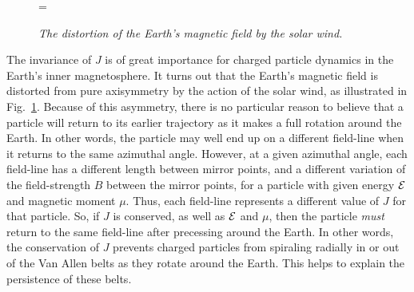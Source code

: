 \begin{figure}
\epsfysize=2in
=\hbox{}
\centerline{}
\caption{\em The distortion of the Earth's magnetic field by the solar wind.}\label{f6}
\end{figure}

The invariance of $J$ is of great importance for charged particle
dynamics in the Earth's inner magnetosphere. It turns out that the
Earth's magnetic field is distorted from pure axisymmetry by the action of
the solar wind, as illustrated in Fig.~\ref{f6}. Because of this asymmetry, there 
is no particular reason to believe that a particle will return to its
earlier trajectory as it makes a full rotation around the Earth.  In other words,
the particle may well end up on a different field-line when it returns to
the same azimuthal angle. However, at a given azimuthal angle, each 
field-line has a different length between mirror points, and a different
variation of the field-strength $B$ between the mirror points, for a particle
with given  energy ${\cal E}$ and magnetic moment $\mu$. Thus, each field-line
represents a different value of $J$ for that particle. So, if $J$ is
conserved, as well as ${\cal E}$ and $\mu$, then the particle
{\em must}\/ return to the same field-line after precessing around the Earth. 
In other words, the conservation of $J$ prevents charged particles from
spiraling radially in or out of the Van Allen belts as they rotate around the Earth.
This helps to explain the persistence of these belts. 

